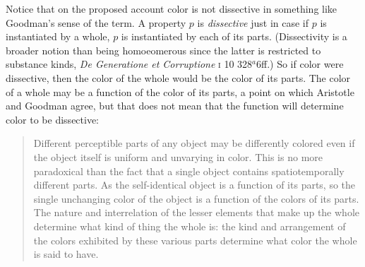 

Notice that on the proposed account color is not dissective in something like Goodman's \citeyearpar[53]{Goodman:1951ww} sense of the term. A property \( p \) is \emph{dissective} just in case if \( p \) is instantiated by a whole, \( p \) is instantiated by each of its parts. (Dissectivity is a broader notion than being homoeomerous since the latter is restricted to substance kinds, \emph{De Generatione et Corruptione} \textsc{i} 10 328\( ^{a} \)6ff.) So if color were dissective, then the color of the whole would be the color of its parts. The color of a whole may be a function of the color of its parts, a point on which Aristotle and Goodman agree, but that does not mean that the function will determine color to be dissective:
\begin{quote}
	Different perceptible parts of any object may be differently colored even if the object itself is uniform and unvarying in color. This is no more paradoxical than the fact that a single object contains spatiotemporally different parts. As the self-identical object is a function of its parts, so the single unchanging color of the object is a function of the colors of its parts. The nature and interrelation of the lesser elements that make up the whole determine what kind of thing the whole is: the kind and arrangement of the colors exhibited by these various parts determine what color the whole is said to have. \citep[130]{Goodman:1951ww}
\end{quote}

